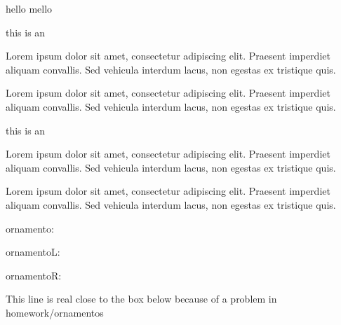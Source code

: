 \documentclass[a4paper]{scrartcl}
\begin{document}
hello mello



this is an 


Lorem ipsum dolor sit amet, consectetur adipiscing elit. Praesent imperdiet aliquam convallis. Sed vehicula interdum lacus, non egestas ex tristique quis.


Lorem ipsum dolor sit amet, consectetur adipiscing elit. Praesent imperdiet aliquam convallis. Sed vehicula interdum lacus, non egestas ex tristique quis.


this is an 


Lorem ipsum dolor sit amet, consectetur adipiscing elit. Praesent imperdiet aliquam convallis. Sed vehicula interdum lacus, non egestas ex tristique quis.




Lorem ipsum dolor sit amet, consectetur adipiscing elit. Praesent imperdiet aliquam convallis. Sed vehicula interdum lacus, non egestas ex tristique quis.

ornamento:

\ornamento

ornamentoL:

\ornamentoLD

ornamentoR:

\ornamentoRD

This line is real close to the box below because of a problem in homework/ornamentos



\end{document}
